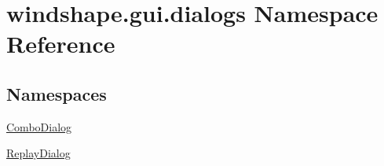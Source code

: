 \hypertarget{namespacewindshape_1_1gui_1_1dialogs}{}\section{windshape.\+gui.\+dialogs Namespace Reference}
\label{namespacewindshape_1_1gui_1_1dialogs}
\subsection*{Namespaces}
\begin{DoxyCompactItemize}
\item 
 \mbox{\hyperlink{namespacewindshape_1_1gui_1_1dialogs_1_1_combo_dialog}{Combo\+Dialog}}
\item 
 \mbox{\hyperlink{namespacewindshape_1_1gui_1_1dialogs_1_1_replay_dialog}{Replay\+Dialog}}
\end{DoxyCompactItemize}
